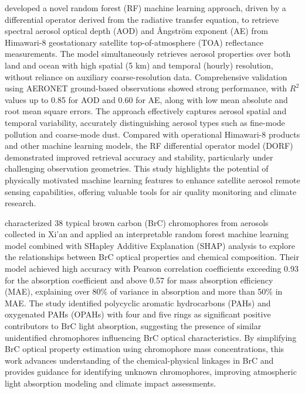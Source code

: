 \documentclass[11pt]{article}
\begin{document}
\citet{bao2023retrieval} developed a novel random forest (RF) machine learning approach, driven by a differential operator derived from the radiative transfer equation, to retrieve spectral aerosol optical depth (AOD) and Ångström exponent (AE) from Himawari-8 geostationary satellite top-of-atmosphere (TOA) reflectance measurements. The model simultaneously retrieves aerosol properties over both land and ocean with high spatial (5 km) and temporal (hourly) resolution, without reliance on auxiliary coarse-resolution data. Comprehensive validation using AERONET ground-based observations showed strong performance, with \(R^2\) values up to 0.85 for AOD and 0.60 for AE, along with low mean absolute and root mean square errors. The approach effectively captures aerosol spatial and temporal variability, accurately distinguishing aerosol types such as fine-mode pollution and coarse-mode dust. Compared with operational Himawari-8 products and other machine learning models, the RF differential operator model (DORF) demonstrated improved retrieval accuracy and stability, particularly under challenging observation geometries. This study highlights the potential of physically motivated machine learning features to enhance satellite aerosol remote sensing capabilities, offering valuable tools for air quality monitoring and climate research.

\citet{wang2024predictions} characterized 38 typical brown carbon (BrC) chromophores from aerosols collected in Xi’an and applied an interpretable random forest machine learning model combined with SHapley Additive Explanation (SHAP) analysis to explore the relationships between BrC optical properties and chemical composition. Their model achieved high accuracy with Pearson correlation coefficients exceeding 0.93 for the absorption coefficient and above 0.57 for mass absorption efficiency (MAE), explaining over 80\% of variance in absorption and more than 50\% in MAE. The study identified polycyclic aromatic hydrocarbons (PAHs) and oxygenated PAHs (OPAHs) with four and five rings as significant positive contributors to BrC light absorption, suggesting the presence of similar unidentified chromophores influencing BrC optical characteristics. By simplifying BrC optical property estimation using chromophore mass concentrations, this work advances understanding of the chemical-physical linkages in BrC and provides guidance for identifying unknown chromophores, improving atmospheric light absorption modeling and climate impact assessments.
\end{document}
